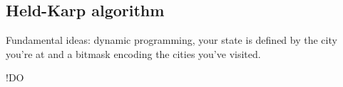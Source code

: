 \subsection{Held-Karp algorithm}
Fundamental ideas: dynamic programming, your state is defined by the city you're at and a bitmask encoding the cities you've visited.\par
!DO

